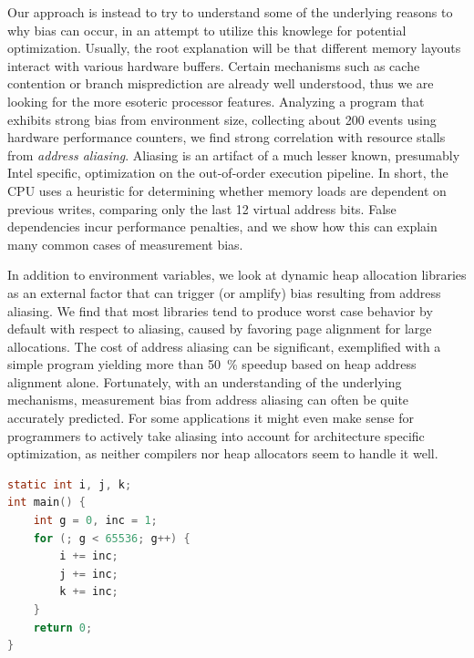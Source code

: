 \documentclass[a4paper,10pt,twocolumn,twoside]{article}
\begin{document}
Our approach is instead to try to understand some of the underlying reasons to why bias can occur, in an attempt to utilize this knowlege for potential optimization. %
Usually, the root explanation will be that different memory layouts interact with various hardware buffers.
Certain mechanisms such as cache contention or branch misprediction are already well understood, thus we are looking for the more esoteric processor features.
Analyzing a program that exhibits strong bias from environment size, collecting about 200 events using hardware performance counters, we find strong correlation with resource stalls from \emph{address aliasing}.
Aliasing is an artifact of a much lesser known, presumably Intel specific, optimization on the out-of-order execution pipeline.
In short, the CPU uses a heuristic for determining whether memory loads are dependent on previous writes, comparing only the last 12 virtual address bits.
False dependencies incur performance penalties, and we show how this can explain many common cases of measurement bias.

In addition to environment variables, we look at dynamic heap allocation libraries as an external factor that can trigger (or amplify) bias resulting from address aliasing.
We find that most libraries tend to produce worst case behavior by default with respect to aliasing, caused by favoring page alignment for large allocations.
The cost of address aliasing can be significant, exemplified with a simple program yielding more than 50~\% speedup based on heap address alignment alone.
Fortunately, with an understanding of the underlying mechanisms, measurement bias from address aliasing can often be quite accurately predicted.
For some applications it might even make sense for programmers to actively take aliasing into account for architecture specific optimization, as neither compilers nor heap allocators seem to handle it well.

\begin{lstlisting}[float=t, language=C, caption={Micro-kernel succeptible to aliasing between static and automatic variables depending on environment sizes}, label={lst:loopkernel}, frame=lines]
static int i, j, k;
int main() {
    int g = 0, inc = 1;
    for (; g < 65536; g++) {
        i += inc;
        j += inc;
        k += inc; 
    }
    return 0;
}
\end{lstlisting}
\end{document}
